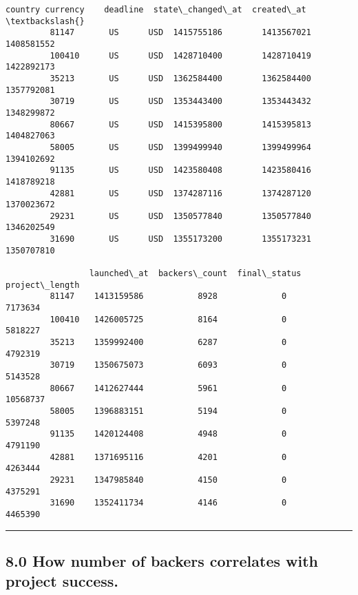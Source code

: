 \documentclass[11pt]{article}
\begin{document}
\begin{Verbatim}[commandchars=\\\{\}]
                country currency    deadline  state\_changed\_at  created\_at  \textbackslash{}
         81147       US      USD  1415755186        1413567021  1408581552   
         100410      US      USD  1428710400        1428710419  1422892173   
         35213       US      USD  1362584400        1362584400  1357792081   
         30719       US      USD  1353443400        1353443432  1348299872   
         80667       US      USD  1415395800        1415395813  1404827063   
         58005       US      USD  1399499940        1399499964  1394102692   
         91135       US      USD  1423580408        1423580416  1418789218   
         42881       US      USD  1374287116        1374287120  1370023672   
         29231       US      USD  1350577840        1350577840  1346202549   
         31690       US      USD  1355173200        1355173231  1350707810   
         
                 launched\_at  backers\_count  final\_status  project\_length  
         81147    1413159586           8928             0         7173634  
         100410   1426005725           8164             0         5818227  
         35213    1359992400           6287             0         4792319  
         30719    1350675073           6093             0         5143528  
         80667    1412627444           5961             0        10568737  
         58005    1396883151           5194             0         5397248  
         91135    1420124408           4948             0         4791190  
         42881    1371695116           4201             0         4263444  
         29231    1347985840           4150             0         4375291  
         31690    1352411734           4146             0         4465390  
\end{Verbatim}
            
    \begin{center}\rule{0.5\linewidth}{\linethickness}\end{center}

\subsection{8.0 How number of backers correlates with project
success.}\label{how-number-of-backers-correlates-with-project-success.}
\end{document}
